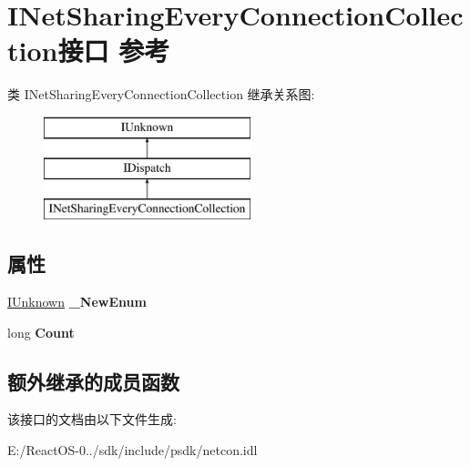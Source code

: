\hypertarget{interface_i_net_sharing_every_connection_collection}{}\section{I\+Net\+Sharing\+Every\+Connection\+Collection接口 参考}
\label{interface_i_net_sharing_every_connection_collection}
类 I\+Net\+Sharing\+Every\+Connection\+Collection 继承关系图\+:\begin{figure}[H]
\begin{center}
\leavevmode
\includegraphics[height=3.000000cm]{interface_i_net_sharing_every_connection_collection}
\end{center}
\end{figure}
\subsection*{属性}
\begin{DoxyCompactItemize}
\item 
\mbox{\label{interface_i_net_sharing_every_connection_collection_a73e102002e13e66c50457811d83c469f}} 
\hyperlink{interface_i_unknown}{I\+Unknown} {\bfseries \+\_\+\+New\+Enum}
\item 
\mbox{\label{interface_i_net_sharing_every_connection_collection_aea5139ef99487430c9363c242f150b8a}} 
long {\bfseries Count}
\end{DoxyCompactItemize}
\subsection*{额外继承的成员函数}


该接口的文档由以下文件生成\+:\begin{DoxyCompactItemize}
\item 
E\+:/\+React\+O\+S-\/0../sdk/include/psdk/netcon.\+idl\end{DoxyCompactItemize}
